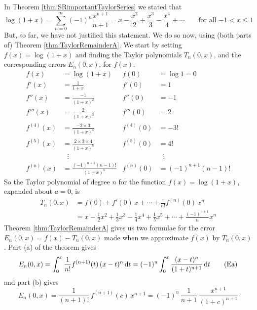 \begin{eg}\label{eg:integralRemainder}
In Theorem \ref{thm:SRimportantTaylorSeries} we stated that
\begin{equation*}
\log(1+x) = \sum_{n=0}^\infty (-1)^n\frac{x^{n+1}}{n+1}
     = x-\frac{x^2}{2}+\frac{x^3}{3}-\frac{x^4}{4}+\cdots
    \qquad\text{for all $-1<x\le 1$} 
\tag{S1}\end{equation*}
But, so far, we have not justified this statement. We do so now, using (both parts of) Theorem \ref{thm:TaylorRemainderA}. We start by setting 
$f(x)=\log(1+x)$ and finding the Taylor polynomials $T_n(0,x)$, and the corresponding errors $E_n(0,x)$, for $f(x)$.
\begin{align*}
  f(x) &= \log(1+x) & f(0) &= \log 1 = 0 \\
  f'(x) &= \frac{1}{1+x} & f'(0) &= 1 \\
  f''(x) &= \frac{-1}{(1+x)^2} & f''(0) &= -1 \\
  f'''(x) &= \frac{2}{(1+x)^3} & f'''(0) &= 2 \\
  f^{(4)}(x) &= \frac{-2\times 3}{(1+x)^4} & f^{(4)}(0) &= -3! \\
  f^{(5)}(x) &= \frac{2\times 3\times 4}{(1+x)^5} & f^{(5)}(0) &= 4! \\
             &\ \ \ \vdots  &  &\ \ \ \vdots \\
  f^{(n)}(x)&=\frac{(-1)^{n+1}(n-1)!}{(1+x)^n} & f^{(n)}(0) &= (-1)^{n+1}(n-1)!
\end{align*}
So the Taylor polynomial of degree $n$ for the function $f(x)=\log(1+x)$,
expanded about $a=0$, is
\begin{align*}
T_n(0,x) &=f(0)+f'(0)\,x+\cdots+\tfrac{1}{n!}f^{(n)}(0)\, x^n \\
 &= x - \frac{1}{2}x^2 + \frac{1}{3}x^3 - \frac{1}{4}x^4 + \frac{1}{5}x^5 
           +\cdots + \frac{(-1)^{n+1}}{n}x^n
\end{align*}
Theorem \ref{thm:TaylorRemainderA} gives us two formulae for the 
error $E_n(0,x) = f(x) - T_n(0,x)$ made when we approximate $f(x)$ 
by $T_n(0,x)$. Part (a) of the theorem gives
\begin{equation*}
E_n(0,x) = \int_0^x \frac{1}{n!}f^{(n+1)}(t)\, (x-t)^n\,\mathrm{d}t
         = (-1)^n \int_0^x \frac{(x-t)^n}{(1+t)^{n+1}}\,\mathrm{d}t
\tag{Ea}\end{equation*}
and part (b) gives
\begin{equation*}
E_n(0,x)=\frac{1}{(n+1)!}\,f^{(n+1)}(c)\, x^{n+1}  
        = (-1)^n\,\frac{1}{n+1}\,\frac{x^{n+1}}{(1+c)^{n+1}}
\tag{Eb}\end{equation*}

\end{eg}
